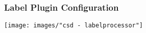 




\begin{frame}
  \frametitle{Label Plugin Configuration}
  \centering
  \hspace{-1cm}
  \texttt{[image: images/"csd - labelprocessor"]}
  

\end{frame}